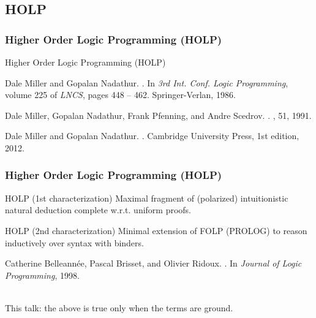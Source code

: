 \documentclass{beamer}
\begin{document}
\subsection{HOLP}

\begin{frame}[fragile]
 \frametitle{Higher Order Logic Programming (HOLP)}

\begin{block}{Higher Order Logic Programming (HOLP)}
\begin{thebibliography}{1}

Dale Miller and Gopalan Nadathur.
.
\newblock In {\em 3rd Int. Conf. Logic Programming}, volume 225 of {\em LNCS},
  pages 448 -- 462. Springer-Verlan, 1986.

Dale Miller, Gopalan Nadathur, Frank Pfenning, and Andre Scedrov.
.
, 51, 1991.

Dale Miller and Gopalan Nadathur.
.
\newblock Cambridge University Press, 1st edition, 2012.

\end{thebibliography}
\end{block}
\end{frame}

\begin{frame}[fragile]
 \frametitle{Higher Order Logic Programming (HOLP)}

\begin{block}{HOLP (1st characterization)}
Maximal fragment of (polarized) intuitionistic natural deduction complete w.r.t. uniform proofs.
\end{block}

\begin{block}{HOLP (2nd characterization)}
Minimal extension of FOLP (PROLOG) to reason inductively over syntax with binders.
\begin{thebibliography}{1}
Catherine Belleannée, Pascal Brisset, and Olivier Ridoux.
.
\newblock In {\em Journal of Logic Programming}, 1998.
\end{thebibliography}

\alert{~\\This talk: the above is true only when the terms are ground.}
\end{block}
\end{frame}
\end{document}
